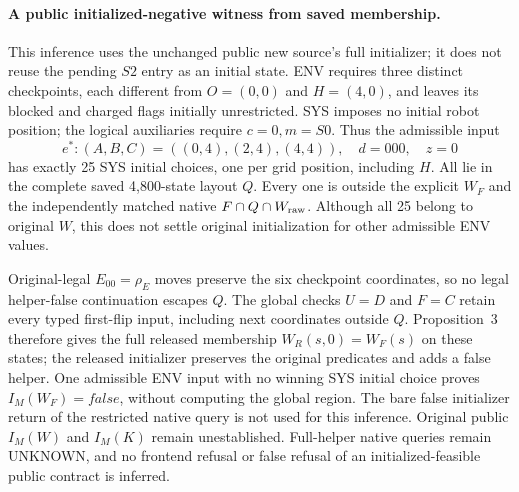 \paragraph{A public initialized-negative witness from saved membership.}
This inference uses the unchanged public new source's full initializer;
it does not reuse the pending $S2$ entry as an initial state. ENV requires
three distinct checkpoints, each different from $O=(0,0)$ and $H=(4,0)$,
and leaves its blocked and charged flags initially unrestricted.
SYS imposes no initial robot position; the logical auxiliaries require
$c=0,m=S0$. Thus the admissible input
\[
 e^*: (A,B,C)=((0,4),(2,4),(4,4)),\quad d=000,\quad z=0
\]
has exactly 25 SYS initial choices, one per grid position, including $H$.
All lie in the complete saved 4,800-state layout $Q$. Every one is outside
the explicit $W_F$ and the independently matched native $F\cap Q\cap W_{\rm raw}$.
Although all 25 belong to original $W$, this does not settle original
initialization for other admissible ENV values.

Original-legal $E_{00}=\rho_E$ moves preserve the six checkpoint
coordinates, so no legal helper-false continuation escapes $Q$.
The global checks $U=D$ and $F=C$ retain every typed first-flip input,
including next coordinates outside $Q$. Proposition~3 therefore gives
the full released membership $W_R(s,0)=W_F(s)$ on these states; the
released initializer preserves the original predicates and adds a false
helper. One admissible ENV input with no winning SYS initial choice
proves $I_M(W_F)=\mathit{false}$, without computing the global region.
The bare false initializer return of the restricted native query is not
used for this inference. Original public $I_M(W)$ and $I_M(K)$ remain
unestablished. Full-helper native queries remain UNKNOWN, and no
frontend refusal or false refusal of an initialized-feasible public
contract is inferred.

